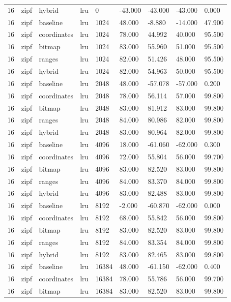 \begin{tabular}{lllllllll}
16 & zipf & hybrid & lru & 0 & -43.000 & -43.000 & -43.000 & 0.000 \\
16 & zipf & baseline & lru & 1024 & 48.000 & -8.880 & -14.000 & 47.900 \\
16 & zipf & coordinates & lru & 1024 & 78.000 & 44.992 & 40.000 & 95.500 \\
16 & zipf & bitmap & lru & 1024 & 83.000 & 55.960 & 51.000 & 95.500 \\
16 & zipf & ranges & lru & 1024 & 82.000 & 51.426 & 48.000 & 95.500 \\
16 & zipf & hybrid & lru & 1024 & 82.000 & 54.963 & 50.000 & 95.500 \\
16 & zipf & baseline & lru & 2048 & 48.000 & -57.078 & -57.000 & 0.200 \\
16 & zipf & coordinates & lru & 2048 & 78.000 & 56.114 & 57.000 & 99.800 \\
16 & zipf & bitmap & lru & 2048 & 83.000 & 81.912 & 83.000 & 99.800 \\
16 & zipf & ranges & lru & 2048 & 84.000 & 80.986 & 82.000 & 99.800 \\
16 & zipf & hybrid & lru & 2048 & 83.000 & 80.964 & 82.000 & 99.800 \\
16 & zipf & baseline & lru & 4096 & 18.000 & -61.060 & -62.000 & 0.300 \\
16 & zipf & coordinates & lru & 4096 & 72.000 & 55.804 & 56.000 & 99.700 \\
16 & zipf & bitmap & lru & 4096 & 83.000 & 82.520 & 83.000 & 99.800 \\
16 & zipf & ranges & lru & 4096 & 84.000 & 83.370 & 84.000 & 99.800 \\
16 & zipf & hybrid & lru & 4096 & 83.000 & 82.488 & 83.000 & 99.800 \\
16 & zipf & baseline & lru & 8192 & -2.000 & -60.870 & -62.000 & 0.000 \\
16 & zipf & coordinates & lru & 8192 & 68.000 & 55.842 & 56.000 & 99.800 \\
16 & zipf & bitmap & lru & 8192 & 83.000 & 82.520 & 83.000 & 99.800 \\
16 & zipf & ranges & lru & 8192 & 84.000 & 83.354 & 84.000 & 99.800 \\
16 & zipf & hybrid & lru & 8192 & 83.000 & 82.465 & 83.000 & 99.800 \\
16 & zipf & baseline & lru & 16384 & 48.000 & -61.150 & -62.000 & 0.400 \\
16 & zipf & coordinates & lru & 16384 & 78.000 & 55.786 & 56.000 & 99.700 \\
16 & zipf & bitmap & lru & 16384 & 83.000 & 82.520 & 83.000 & 99.800 \\

\end{tabular}

